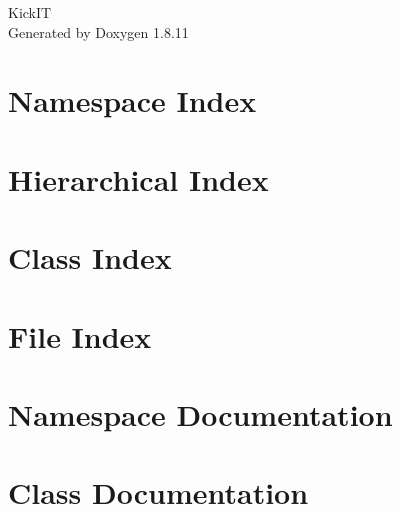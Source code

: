 \documentclass[twoside]{book}
\newcommand{\+}{\discretionary{\mbox{\scriptsize$\hookleftarrow$}}{}{}}
\newcommand{\clearemptydoublepage}{%
  \newpage{\pagestyle{empty}\cleardoublepage}%
}
\begin{document}
\hypersetup{pageanchor=false,
             bookmarksnumbered=true,
             pdfencoding=unicode
            }
\begin{titlepage}
\vspace*{7cm}
\begin{center}%
{\Large Kick\+IT }\\
\vspace*{1cm}
{\large Generated by Doxygen 1.8.11}\\
\end{center}
\end{titlepage}
\clearemptydoublepage
\tableofcontents
\clearemptydoublepage
{}
\hypersetup{pageanchor=true}

\chapter{Namespace Index}

\chapter{Hierarchical Index}

\chapter{Class Index}

\chapter{File Index}

\chapter{Namespace Documentation}

\chapter{Class Documentation}
































\end{document}
